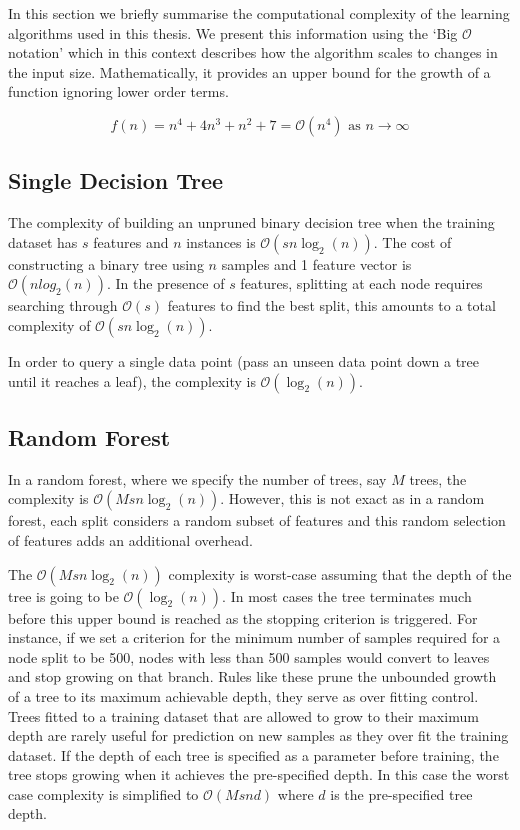In this section we briefly summarise the computational complexity of the learning algorithms used in this thesis. We present this information using the `Big $\mathcal{O}$ notation' which in this context describes how the algorithm scales to changes in the input size. Mathematically, it provides an upper bound for the growth of a function ignoring lower order terms. %

\begin{equation}
f(n) = n^{4} + 4n^{3} + n^{2} + 7 = \mathcal{O}(n^{4}) \textrm{ as } n \rightarrow \infty 
\end{equation}


\subsection{Single Decision Tree}

The complexity of building an unpruned binary decision tree when the training dataset has $s$ features and $n$ instances is $\mathcal{O}(sn\log_{2}(n))$. The cost of constructing a binary tree using $n$ samples and 1 feature vector is $\mathcal{O}(nlog_{2}(n))$. In the presence of $s$ features, splitting at each node requires searching through $\mathcal{O}(s)$ features to find the best split, this amounts to a total complexity of $\mathcal{O}(sn\log_{2}(n))$.

In order to query a single data point (pass an unseen data point down a tree until it reaches a leaf), the complexity is $\mathcal{O}(\log_{2}(n))$. 

\subsection{Random Forest}

In a random forest, where we specify the number of trees, say $M$ trees, the complexity is $\mathcal{O}(Msn\log_{2}(n))$. However, this is not exact as in a random forest, each split considers a random subset of features and this random selection of features adds an additional overhead.  

The $\mathcal{O}(Msn\log_{2}(n))$ complexity is worst-case assuming that the depth of the tree is going to be $\mathcal{O}(\log_{2}(n))$. In most cases the tree terminates much before this upper bound is reached as the stopping criterion is triggered. For instance, if we set a criterion for the minimum number of samples required for a node split to be 500, nodes with less than 500 samples would convert to leaves and stop growing on that branch. Rules like these prune the unbounded growth of a tree to its maximum achievable depth, they serve as over fitting control. Trees fitted to a training dataset that are allowed to grow to their maximum depth are rarely useful for prediction on new samples as they over fit the training dataset. If the depth of each tree is specified as a parameter before training, the tree stops growing when it achieves the pre-specified depth. In this case the worst case complexity is simplified to $\mathcal{O}(Msnd)$ where $d$ is the pre-specified tree depth.


